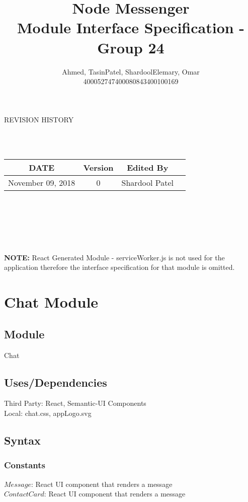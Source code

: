 \documentclass[12pt, titlepage]{article}
\title{\Huge\textbf{Node Messenger}\\
		\huge{Module Interface Specification - Group 24}}
\author{Ahmed, Tasin\hspace{1cm}Patel, Shardool\hspace{1cm}Elemary, Omar \\
		400052747\hspace{2cm}400080843\hspace{2cm}400100169}
\begin{document}
\maketitle
  	\begin{center}
    REVISION HISTORY
\end{center}\\\

\begin{table}[hp]
\begin{center}
\label{tab:}
\begin{tabular}{|c|c|c|c|}
\hline
\textbf{DATE} & \textbf{Version} & \textbf{Edited By}\\
\hline
November 09, 2018 & 0 & Shardool Patel\\
\hline
\end{tabular}\\\\
\end{center}
\label{default}
\end{table}
\\\\
\begin{center}
    \textbf{NOTE:} React Generated Module - serviceWorker.js is not used for the application therefore the interface specification for that module is omitted.
\end{center}


\newpage

\section* {Chat Module}

\subsection*{Module}

Chat

\subsection* {Uses/Dependencies}
Third Party: React, Semantic-UI Components\\
Local: chat.css, appLogo.svg

\subsection* {Syntax}

\subsubsection* {Constants} 
$Message$: React UI component that renders a message\\
$Contact Card$: React UI component that renders a message
\end{document}

